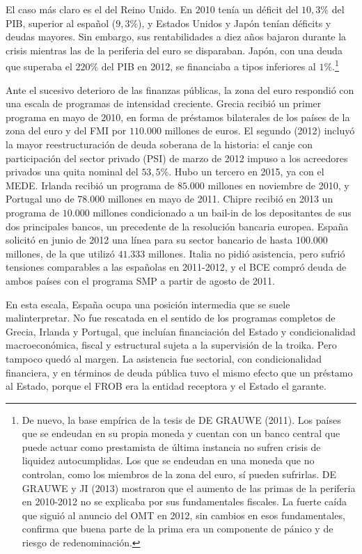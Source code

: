 \documentclass[10pt,a4paper]{article}
\begin{document}
El caso más claro es el del Reino Unido. En 2010 tenía un déficit del $10,3\%$ del PIB, superior al español ($9,3\%$), y Estados Unidos y Japón tenían déficits y deudas mayores. Sin embargo, sus rentabilidades a diez años bajaron durante la crisis mientras las de la periferia del euro se disparaban. Japón, con una deuda que superaba el $220\%$ del PIB en 2012, se financiaba a tipos inferiores al $1\%$.\footnote{
De nuevo, la base empírica de la tesis de DE GRAUWE (2011). Los países que se endeudan en su propia moneda y cuentan con un banco central que puede actuar como prestamista de última instancia no sufren crisis de liquidez autocumplidas. Los que se endeudan en una moneda que no controlan, como los miembros de la zona del euro, sí pueden sufrirlas. DE GRAUWE y JI (2013) mostraron que el aumento de las primas de la periferia en 2010-2012 no se explicaba por sus fundamentales fiscales. La fuerte caída que siguió al anuncio del OMT en 2012, sin cambios en esos fundamentales, confirma que buena parte de la prima era un componente de pánico y de riesgo de redenominación.
}

Ante el sucesivo deterioro de las finanzas públicas, la zona del euro respondió con una escala de programas de intensidad creciente. Grecia recibió un primer programa en mayo de 2010, en forma de préstamos bilaterales de los países de la zona del euro y del FMI por $110.000$ millones de euros. El segundo (2012) incluyó la mayor reestructuración de deuda soberana de la historia: el canje con participación del sector privado (PSI) de marzo de 2012 impuso a los acreedores privados una quita nominal del $53,5\%$. Hubo un tercero en 2015, ya con el MEDE. Irlanda recibió un programa de $85.000$ millones en noviembre de 2010, y Portugal uno de $78.000$ millones en mayo de 2011. Chipre recibió en 2013 un programa de $10.000$ millones condicionado a un bail-in de los depositantes de sus dos principales bancos, un precedente de la resolución bancaria europea. España solicitó en junio de 2012 una línea para su sector bancario de hasta $100.000$ millones, de la que utilizó $41.333$ millones. Italia no pidió asistencia, pero sufrió tensiones comparables a las españolas en 2011-2012, y el BCE compró deuda de ambos países con el programa SMP a partir de agosto de 2011.

En esta escala, España ocupa una posición intermedia que se suele malinterpretar. No fue rescatada en el sentido de los programas completos de Grecia, Irlanda y Portugal, que incluían financiación del Estado y condicionalidad macroeconómica, fiscal y estructural sujeta a la supervisión de la troika. Pero tampoco quedó al margen. La asistencia fue sectorial, con condicionalidad financiera, y en términos de deuda pública tuvo el mismo efecto que un préstamo al Estado, porque el FROB era la entidad receptora y el Estado el garante.
\end{document}
